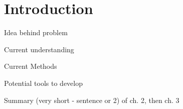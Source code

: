 \chapter{Introduction} \label{chap:chap1}

Idea behind problem

Current understanding 

Current Methods

Potential tools to develop

Summary (very short - sentence or 2) of ch. 2, then ch. 3 